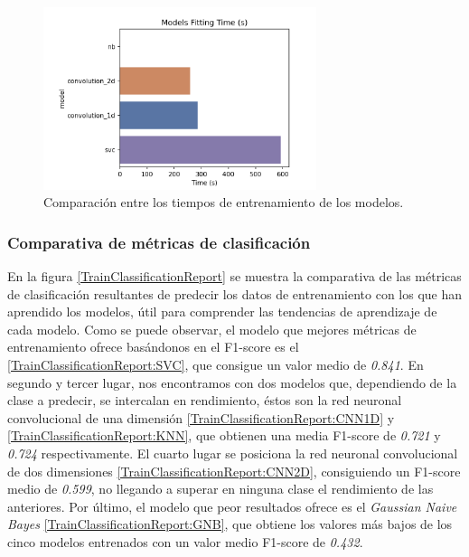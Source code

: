     \begin{figure}[h]
      \centering
      \includegraphics[width=8cm]{archivos/5.Resultados/TiemposEntrenamiento}
      \caption{Comparación entre los tiempos de entrenamiento de los modelos.}
      \label{TiemposEntrenamientoImage}
    \end{figure}


  \subsubsection{Comparativa de métricas de clasificación}

    En la figura \eqref{TrainClassificationReport} se muestra la comparativa de las métricas de clasificación resultantes de predecir los datos de entrenamiento con los que han aprendido los modelos, útil para comprender las tendencias de aprendizaje de cada modelo. Como se puede observar, el modelo que mejores métricas de entrenamiento ofrece basándonos en el F1-score es el  \eqref{TrainClassificationReport:SVC}, que consigue un valor medio de \textit{0.841}. En segundo y tercer lugar, nos encontramos con dos modelos que, dependiendo de la clase a predecir, se intercalan en rendimiento, éstos son la red neuronal convolucional de una dimensión \eqref{TrainClassificationReport:CNN1D} y  \eqref{TrainClassificationReport:KNN}, que obtienen una media F1-score de \textit {0.721} y \textit {0.724} respectivamente. El cuarto lugar se posiciona la red neuronal convolucional de dos dimensiones \eqref{TrainClassificationReport:CNN2D}, consiguiendo un F1-score medio de \textit{0.599}, no llegando a superar en ninguna clase el rendimiento de las anteriores. Por último, el modelo que peor resultados ofrece es el \textit{Gaussian Naive Bayes} \eqref{TrainClassificationReport:GNB}, que obtiene los valores más bajos de los cinco modelos entrenados con un valor medio F1-score de \textit{0.432}.

